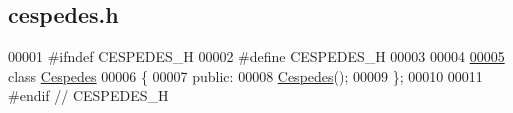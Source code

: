 \hypertarget{cespedes_8h_source}{}\subsection{cespedes.\+h}
\label{cespedes_8h_source}

\begin{DoxyCode}
00001 \textcolor{preprocessor}{#ifndef CESPEDES\_H}
00002 \textcolor{preprocessor}{#define CESPEDES\_H}
00003 
00004 
\hypertarget{cespedes_8h_source_l00005}{}\hyperlink{class_cespedes}{00005} \textcolor{keyword}{class }\hyperlink{class_cespedes}{Cespedes}
00006 \{
00007 \textcolor{keyword}{public}:
00008   \hyperlink{class_cespedes_a99ce54693c7ff065d8973167cee9caa7}{Cespedes}();
00009 \};
00010 
00011 \textcolor{preprocessor}{#endif // CESPEDES\_H}
\end{DoxyCode}
